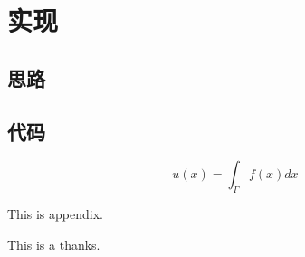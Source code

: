 \documentclass[twoside,UTF8,phd]{nputhesis}
\theoremstyle{plain}
\begin{document}
\chapter{实现}
\section{思路}
\section{代码}
\begin{equation}
    u(x) = \int_{\Gamma} f(x)dx
\end{equation}

\backmatter



\Appendix
This is appendix.

\Thanks
This is a thanks.

\Work

\statement
\end{document}
